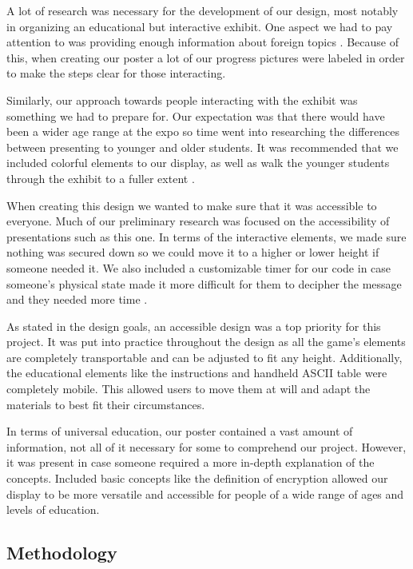\documentclass[conference]{IEEEtran}
\begin{document}
\par A lot of research was necessary for the development of our design, most notably in organizing an educational but interactive exhibit. One aspect we had to pay attention to was providing enough information about foreign topics \cite{b6}. Because of this, when creating our poster a lot of our progress pictures were labeled in order to make the steps clear for those interacting. 
\par Similarly, our approach towards people interacting with the exhibit was something we had to prepare for. Our expectation was that there would have been a wider age range at the expo so time went into researching the differences between presenting to younger and older students. It was recommended that we included colorful elements to our display, as well as walk the younger students through the exhibit to a fuller extent \cite{b16}.
\par When creating this design we wanted to make sure that it was accessible to everyone. Much of our preliminary research was focused on the accessibility of presentations such as this one. In terms of the interactive elements, we made sure nothing was secured down so we could move it to a higher or lower height if someone needed it. We also included a customizable timer for our code in case someone’s physical state made it more difficult for them to decipher the message and they needed more time \cite{b8}.
\par As stated in the design goals, an accessible design was a top priority for this project. It was put into practice throughout the design as all the game’s elements are completely transportable and can be adjusted to fit any height. Additionally, the educational elements like the instructions and handheld ASCII table were completely mobile. This allowed users to move them at will and adapt the materials to best fit their circumstances.
\par In terms of universal education, our poster contained a vast amount of information, not all of it necessary for some to comprehend our project. However, it was present in case someone required a more in-depth explanation of the concepts. Included basic concepts like the definition of encryption allowed our display to be more versatile and accessible for people of a wide range of ages and levels of education.

\subsection{Methodology}
\end{document}
